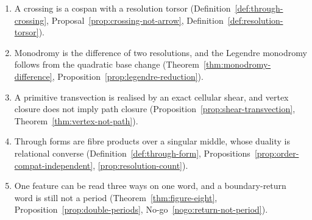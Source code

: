 \begin{enumerate}
\item A crossing is a cospan with a resolution torsor
  (Definition~\ref{def:through-crossing}, Proposal~\ref{prop:crossing-not-arrow},
  Definition~\ref{def:resolution-torsor}).
\item Monodromy is the difference of two resolutions, and the Legendre monodromy follows
  from the quadratic base change (Theorem~\ref{thm:monodromy-difference},
  Proposition~\ref{prop:legendre-reduction}).
\item A primitive transvection is realised by an exact cellular shear, and vertex
  closure does not imply path closure
  (Proposition~\ref{prop:shear-transvection}, Theorem~\ref{thm:vertex-not-path}).
\item Through forms are fibre products over a singular middle, whose duality is
  relational converse (Definition~\ref{def:through-form},
  Propositions~\ref{prop:order-compat-independent}, \ref{prop:resolution-count}).
\item One feature can be read three ways on one word, and a boundary-return word is still
  not a period (Theorem~\ref{thm:figure-eight},
  Proposition~\ref{prop:double-periods}, No-go~\ref{nogo:return-not-period}).
\end{enumerate}
